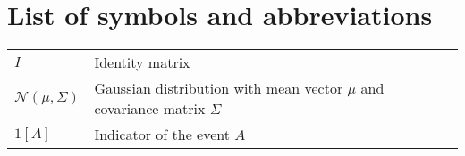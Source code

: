

\chapter*{List of symbols and abbreviations}

\begin{tabularx}{0.9\textwidth}{lX}
    $I$ & Identity matrix \\
    $\mathcal{N}(\mu, \Sigma)$ & Gaussian distribution with mean vector $\mu$ and covariance matrix $\Sigma$\\
    $1\left[A\right]$ & Indicator of the event $A$ \\
\end{tabularx}